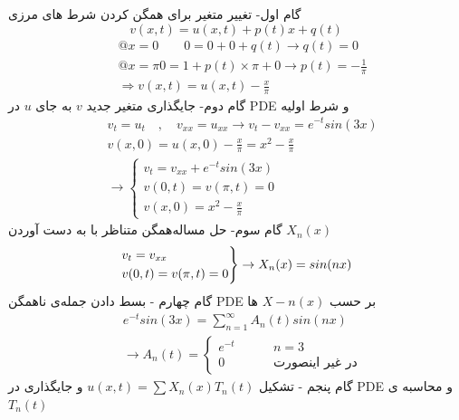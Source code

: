 گام اول- تغییر متغیر برای همگن کردن شرط های مرزی
\[
v(x,t)=u(x,t)+p(t)x+q(t)
\]
\begin{equation*}
	\begin{aligned}
		{} &\
		@ x=0\qquad 0=0+0+q(t)\rightarrow q(t)=0
		\\ &\
		@ x=\pi 0=1+p(t)\times \pi +0\rightarrow p(t)=-\frac1\pi
		\\ &\
		\Rightarrow v(x,t)=u(x,t)-\frac x\pi
	\end{aligned}
\end{equation*}
گام دوم- جایگذاری متغیر جدید
$v$
به جای
$u$
در PDE و شرط اولیه
\begin{equation*}
	\begin{aligned}
	{} &\
	v_t=u_t\quad,\quad v_{xx}=u_{xx}\rightarrow v_t-v_{xx}=e^{-t}sin(3x)
	\\ &\
	v(x,0)=u(x,0)-\frac x\pi=x^2-\frac x\pi
	\\ &\
	\rightarrow
	\begin{cases}
		v_t=v_{xx}+e^{-t}sin(3x)
		\\
		v(0,t)=v(\pi,t)=0
		\\
		v(x,0)=x^2-\frac x\pi
	\end{cases}
	\end{aligned}
\end{equation*}
گام سوم-
حل مساله‌همگن متناظر با به دست آوردن
$X_n(x)$
\begin{equation*}
	\begin{rcases}
		v_t=v_{xx}\\
		v(0,t)=v(\pi,t)=0
	\end{rcases}
	\rightarrow
	X_n(x)=sin(nx)
\end{equation*}
گام چهارم - بسط دادن جمله‌ی نا‌همگن PDE بر حسب
$X-n(x)$
ها
\begin{equation*}
	\begin{aligned}
		{} &\
		e^{-t}sin(3x)=\sum_{n=1}^\infty A_n(t)sin(nx)
		\\ &\
		\rightarrow
		A_n(t)=
		\begin{cases}
			e^{-t}\qquad &\ n=3
			\\
			0 \qquad &\ \text{در غیر اینصورت}
		\end{cases}
	\end{aligned}
\end{equation*}
گام پنجم - تشکیل
$u(x,t)=\sum X_n(x)T_n(t)$
و جایگذاری در PDE و محاسبه ی
$T_n(t)$
